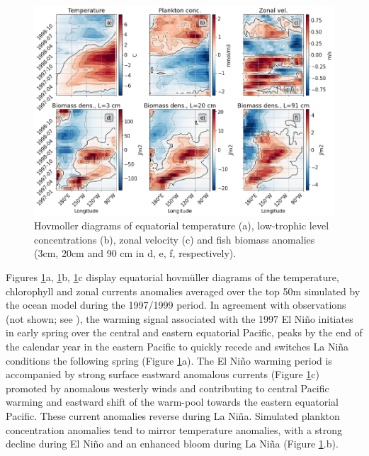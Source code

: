 \begin{figure}
	\centering
	\includegraphics[scale=0.4]{figs/fig5.png}	
	\caption{Hovmoller diagrams of equatorial temperature (a), low-trophic level concentrations (b), zonal velocity (c) and fish biomass anomalies (3cm, 20cm and 90 cm in d, e, f, respectively).}	
	\label{fig:hov_nemo_ape}
\end{figure}

Figures \ref{fig:hov_nemo_ape}a, \ref{fig:hov_nemo_ape}b, \ref{fig:hov_nemo_ape}c display equatorial hovmüller diagrams of the temperature, chlorophyll and zonal currents anomalies averaged over the top 50m simulated by the ocean model during the 1997/1999 period. In agreement with observations (not shown; see \cite{lengaigneOceanResponseMarch2002}), the warming signal associated with the 1997 El Niño initiates in early spring over the central and eastern equatorial Pacific, peaks by the end of the calendar year in the eastern Pacific to quickly recede and switches La Niña conditions the following spring (Figure \ref{fig:hov_nemo_ape}a). The El Niño warming period is accompanied by strong surface eastward anomalous currents (Figure \ref{fig:hov_nemo_ape}c) promoted by anomalous westerly winds and contributing to central Pacific warming and eastward shift of the warm-pool towards the eastern equatorial Pacific. These current anomalies reverse during La Niña. Simulated plankton concentration anomalies tend to mirror temperature anomalies, with a strong decline during El Niño and an enhanced bloom during La Niña (Figure \ref{fig:hov_nemo_ape}.b). 

